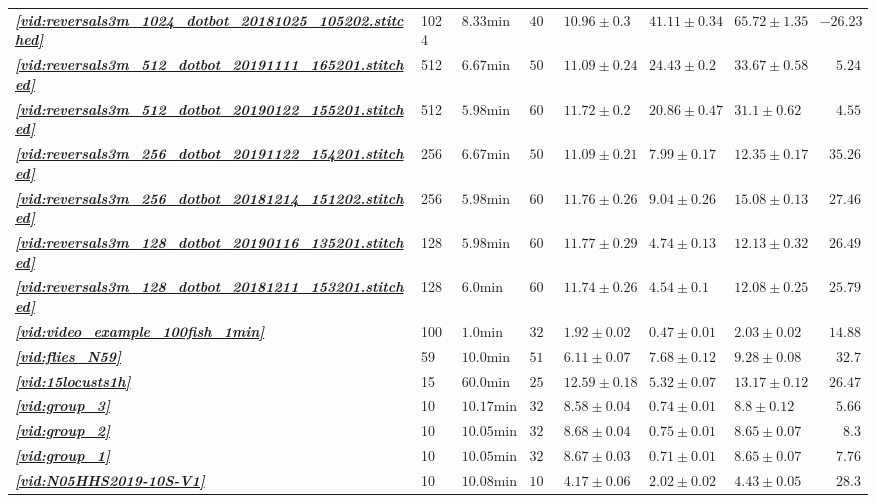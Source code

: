 \documentclass[9pt,lineno]{elife}
\newcommand{\vidref}[1]{\textit{\textbf{\ref{#1}}}}
\begin{document}
\begin{table}[h]
\begin{tabular}{l l l l | l l l | r}
\vidref{vid:reversals3m_1024_dotbot_20181025_105202.stitched} & 1024 & $ 8.33 \mathrm{min} $ & $ 40 $ & $ 10.96 \pm 0.3 $ & $ 41.11 \pm 0.34 $ & $ 65.72 \pm 1.35 $ &$ -26.23 $ \\
\vidref{vid:reversals3m_512_dotbot_20191111_165201.stitched} & 512 & $ 6.67 \mathrm{min} $ & $ 50 $ & $ 11.09 \pm 0.24 $ & $ 24.43 \pm 0.2 $ & $ 33.67 \pm 0.58 $ &$ 5.24 $ \\
\vidref{vid:reversals3m_512_dotbot_20190122_155201.stitched} & 512 & $ 5.98 \mathrm{min} $ & $ 60 $ & $ 11.72 \pm 0.2 $ & $ 20.86 \pm 0.47 $ & $ 31.1 \pm 0.62 $ &$ 4.55 $ \\
\vidref{vid:reversals3m_256_dotbot_20191122_154201.stitched} & 256 & $ 6.67 \mathrm{min} $ & $ 50 $ & $ 11.09 \pm 0.21 $ & $ 7.99 \pm 0.17 $ & $ 12.35 \pm 0.17 $ &$ 35.26 $ \\
\vidref{vid:reversals3m_256_dotbot_20181214_151202.stitched} & 256 & $ 5.98 \mathrm{min} $ & $ 60 $ & $ 11.76 \pm 0.26 $ & $ 9.04 \pm 0.26 $ & $ 15.08 \pm 0.13 $ &$ 27.46 $ \\
\vidref{vid:reversals3m_128_dotbot_20190116_135201.stitched} & 128 & $ 5.98 \mathrm{min} $ & $ 60 $ & $ 11.77 \pm 0.29 $ & $ 4.74 \pm 0.13 $ & $ 12.13 \pm 0.32 $ &$ 26.49 $ \\
\vidref{vid:reversals3m_128_dotbot_20181211_153201.stitched} & 128 & $ 6.0 \mathrm{min} $ & $ 60 $ & $ 11.74 \pm 0.26 $ & $ 4.54 \pm 0.1 $ & $ 12.08 \pm 0.25 $ &$ 25.79 $ \\
\vidref{vid:video_example_100fish_1min} & 100 & $ 1.0 \mathrm{min} $ & $ 32 $ & $ 1.92 \pm 0.02 $ & $ 0.47 \pm 0.01 $ & $ 2.03 \pm 0.02 $ &$ 14.88 $ \\
\vidref{vid:flies_N59} & 59 & $ 10.0 \mathrm{min} $ & $ 51 $ & $ 6.11 \pm 0.07 $ & $ 7.68 \pm 0.12 $ & $ 9.28 \pm 0.08 $ &$ 32.7 $ \\
\vidref{vid:15locusts1h} & 15 & $ 60.0 \mathrm{min} $ & $ 25 $ & $ 12.59 \pm 0.18 $ & $ 5.32 \pm 0.07 $ & $ 13.17 \pm 0.12 $ &$ 26.47 $ \\
\vidref{vid:group_3} & 10 & $ 10.17 \mathrm{min} $ & $ 32 $ & $ 8.58 \pm 0.04 $ & $ 0.74 \pm 0.01 $ & $ 8.8 \pm 0.12 $ &$ 5.66 $ \\
\vidref{vid:group_2} & 10 & $ 10.05 \mathrm{min} $ & $ 32 $ & $ 8.68 \pm 0.04 $ & $ 0.75 \pm 0.01 $ & $ 8.65 \pm 0.07 $ &$ 8.3 $ \\
\vidref{vid:group_1} & 10 & $ 10.05 \mathrm{min} $ & $ 32 $ & $ 8.67 \pm 0.03 $ & $ 0.71 \pm 0.01 $ & $ 8.65 \pm 0.07 $ &$ 7.76 $ \\
\vidref{vid:N05HHS2019-10S-V1} & 10 & $ 10.08 \mathrm{min} $ & $ 100 $ & $ 4.17 \pm 0.06 $ & $ 2.02 \pm 0.02 $ & $ 4.43 \pm 0.05 $ &$ 28.3 $ \\

\end{tabular}
\end{table}
\end{document}
